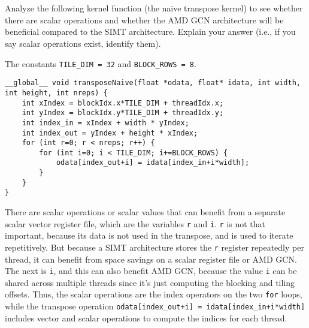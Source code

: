 \documentclass[11pt]{article}
\begin{document}
\section{}

Analyze the following kernel function (the naive transpose kernel) to see whether there are scalar operations and whether the AMD GCN architecture will be beneficial compared to the SIMT architecture. Explain your answer (i.e., if you say scalar operations exist, identify them).

The constants \verb|TILE_DIM = 32| and \verb|BLOCK_ROWS = 8|.
\begin{verbatim}
__global__ void transposeNaive(float *odata, float* idata, int width, int height, int nreps) {
    int xIndex = blockIdx.x*TILE_DIM + threadIdx.x;
    int yIndex = blockIdx.y*TILE_DIM + threadIdx.y;
    int index_in = xIndex + width * yIndex;
    int index_out = yIndex + height * xIndex;
    for (int r=0; r < nreps; r++) {
        for (int i=0; i < TILE_DIM; i+=BLOCK_ROWS) {
            odata[index_out+i] = idata[index_in+i*width];
        }
    }
}
\end{verbatim}

\begin{Answer}
	There are scalar operations or scalar values that can benefit from a separate scalar vector register file, which are the variables \verb|r| and \verb|i|. \verb|r| is not that important, because its data is not used in the transpose, and is used to iterate repetitively. But because a SIMT architecture stores the \verb|r| register repeatedly per thread, it can benefit from space savings on a scalar register file or AMD GCN. The next is \verb|i|, and this can also benefit AMD GCN, because the value \verb|i| can be shared across multiple threads since it's just computing the blocking and tiling offsets. Thus, the scalar operations are the index operators on the two \verb|for| loops, while the transpose operation \verb|odata[index_out+i] = idata[index_in+i*width]| includes vector and scalar operations to compute the indices for each thread.
\end{Answer}
\end{document}
